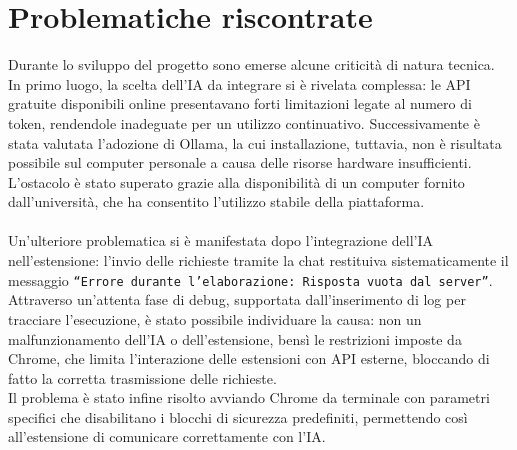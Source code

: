 \section{Problematiche riscontrate}
\noindent Durante lo sviluppo del progetto sono emerse alcune criticità di natura tecnica. In primo luogo, la scelta dell’IA da integrare si è rivelata complessa: le API gratuite disponibili online presentavano forti limitazioni legate al numero di token, rendendole inadeguate per un utilizzo continuativo. Successivamente è stata valutata l’adozione di Ollama, la cui installazione, tuttavia, non è risultata possibile sul computer personale a causa delle risorse hardware insufficienti. L’ostacolo è stato superato grazie alla disponibilità di un computer fornito dall’università, che ha consentito l’utilizzo stabile della piattaforma.\\\\
Un’ulteriore problematica si è manifestata dopo l’integrazione dell’IA nell’estensione: l’invio delle richieste tramite la chat restituiva sistematicamente il messaggio \texttt{“Errore durante l’elaborazione: Risposta vuota dal server”}. Attraverso un’attenta fase di debug, supportata dall’inserimento di log per tracciare l’esecuzione, è stato possibile individuare la causa: non un malfunzionamento dell’IA o dell'estensione, bensì le restrizioni imposte da Chrome, che limita l’interazione delle estensioni con API esterne, bloccando di fatto la corretta trasmissione delle richieste.\\Il problema è stato infine risolto avviando Chrome da terminale con parametri specifici che disabilitano i blocchi di sicurezza predefiniti, permettendo così all’estensione di comunicare correttamente con l’IA.